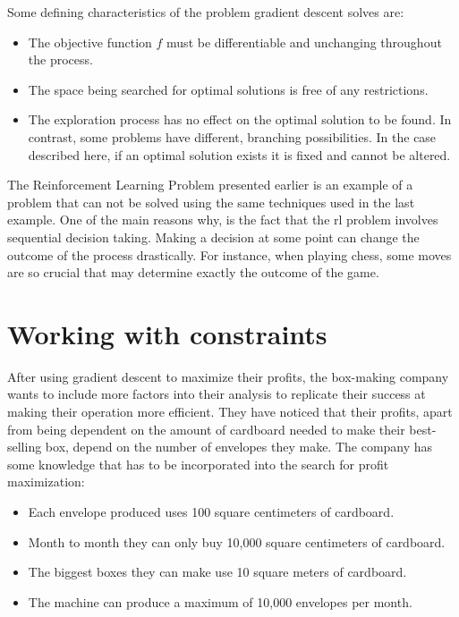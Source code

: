 Some defining characteristics of the problem gradient descent solves are:
\begin{itemize}
    \item The objective function $f$ must be differentiable and unchanging
        throughout the process.
    \item The space being searched for optimal solutions is free of any
        restrictions.
    \item The exploration process has no effect on the optimal solution to be
        found. In contrast, some problems have different, branching possibilities.
        In the case described here, if an optimal solution exists it is fixed and
        cannot be altered.
\end{itemize}
The Reinforcement Learning Problem presented earlier is an example of a problem
that can not be solved using the same techniques used in the last example. One
of the main reasons why, is the fact that the \ac{rl} problem involves sequential
decision taking. Making a decision at some point can change the outcome of the
process drastically. For instance, when playing chess, some moves are so crucial
that may determine exactly the outcome of the game.

\section{Working with constraints}

After using gradient descent to maximize their profits, the box-making company
wants to include more factors into their analysis to replicate their success at
making their operation more efficient. They have noticed that their profits,
apart from being dependent on the amount of cardboard needed to make their
best-selling box, depend on the number of envelopes they make. The company has
some knowledge that has to be incorporated into the search for profit
maximization:
\begin{itemize}
    \item Each envelope produced uses 100 square centimeters of cardboard.
    \item Month to month they can only buy 10,000 square centimeters of cardboard.
    \item The biggest boxes they can make use 10 square meters of cardboard.
    \item The machine can produce a maximum of 10,000 envelopes per month.
\end{itemize}


